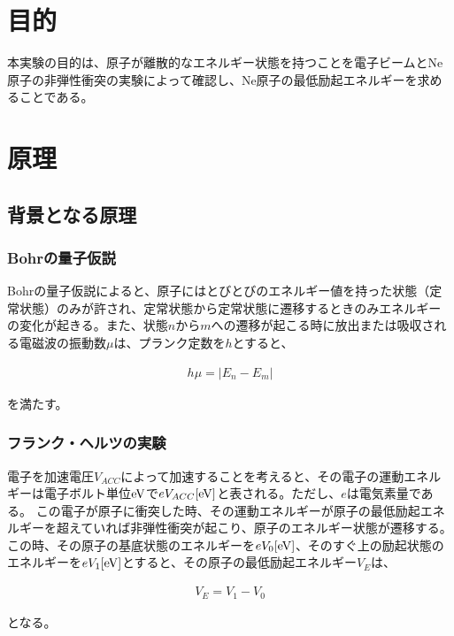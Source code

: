 \documentclass[uplatex,11pt]{jsarticle}
\begin{document}
\section{目的}

本実験の目的は、原子が離散的なエネルギー状態を持つことを電子ビームとNe原子の非弾性衝突の実験によって確認し、Ne原子の最低励起エネルギーを求めることである。

\section{原理}

\subsection{背景となる原理}

\subsubsection{Bohrの量子仮説}

Bohrの量子仮説によると、原子にはとびとびのエネルギー値を持った状態（定常状態）のみが許され、定常状態から定常状態に遷移するときのみエネルギーの変化が起きる。また、状態$n$から$m$への遷移が起こる時に放出または吸収される電磁波の振動数$\mu$は、プランク定数を$h$とすると、

\begin{eqnarray*}
    h\mu = \left|E_n - E_m\right|
\end{eqnarray*}

を満たす。

\subsubsection{フランク・ヘルツの実験}

電子を加速電圧$V_{ACC}$によって加速することを考えると、その電子の運動エネルギーは電子ボルト単位${\rm eV}$で$eV_{ACC}[{\rm eV}]$と表される。ただし、$e$は電気素量である。
この電子が原子に衝突した時、その運動エネルギーが原子の最低励起エネルギーを超えていれば非弾性衝突が起こり、原子のエネルギー状態が遷移する。
この時、その原子の基底状態のエネルギーを$eV_0[{\rm eV}]$、そのすぐ上の励起状態のエネルギーを$eV_1[{\rm eV}]$とすると、その原子の最低励起エネルギー$V_E$は、

\begin{eqnarray*}
    V_E = V_1 - V_0
\end{eqnarray*}

となる。
\end{document}
